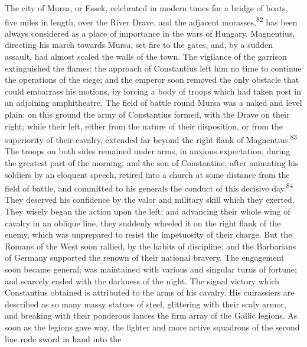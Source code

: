 
The city of Mursa, or Essek, celebrated in modern times for a
bridge of boats, five miles in length, over the River Drave, and
the adjacent morasses,\textsuperscript{82} has been always considered as a place
of importance in the wars of Hungary. Magnentius, directing his
march towards Mursa, set fire to the gates, and, by a sudden
assault, had almost scaled the walls of the town. The vigilance
of the garrison extinguished the flames; the approach of
Constantius left him no time to continue the operations of the
siege; and the emperor soon removed the only obstacle that could
embarrass his motions, by forcing a body of troops which had
taken post in an adjoining amphitheatre. The field of battle
round Mursa was a naked and level plain: on this ground the army
of Constantius formed, with the Drave on their right; while their
left, either from the nature of their disposition, or from the
superiority of their cavalry, extended far beyond the right flank
of Magnentius.\textsuperscript{83} The troops on both sides remained under arms,
in anxious expectation, during the greatest part of the morning;
and the son of Constantine, after animating his soldiers by an
eloquent speech, retired into a church at some distance from the
field of battle, and committed to his generals the conduct of
this decisive day.\textsuperscript{84} They deserved his confidence by the valor
and military skill which they exerted. They wisely began the
action upon the left; and advancing their whole wing of cavalry
in an oblique line, they suddenly wheeled it on the right flank
of the enemy, which was unprepared to resist the impetuosity of
their charge. But the Romans of the West soon rallied, by the
habits of discipline; and the Barbarians of Germany supported the
renown of their national bravery. The engagement soon became
general; was maintained with various and singular turns of
fortune; and scarcely ended with the darkness of the night. The
signal victory which Constantius obtained is attributed to the
arms of his cavalry. His cuirassiers are described as so many
massy statues of steel, glittering with their scaly armor, and
breaking with their ponderous lances the firm array of the Gallic
legions. As soon as the legions gave way, the lighter and more
active squadrons of the second line rode sword in hand into the
